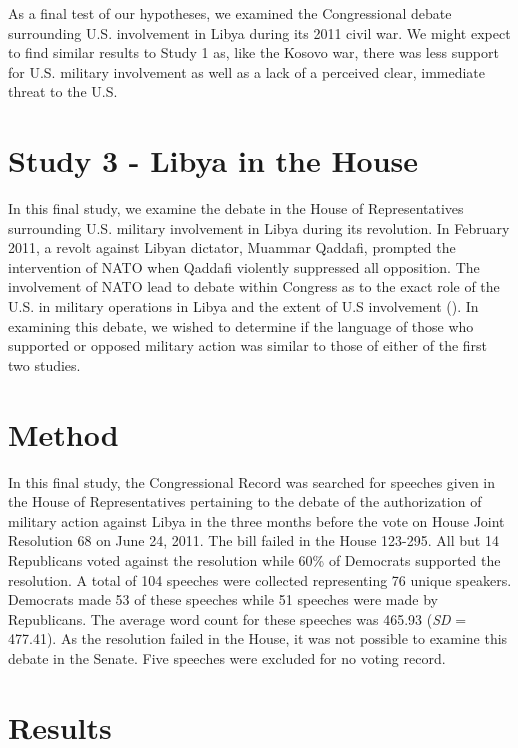 \documentclass[jou,a4paper]{apa6}
\begin{document}
As a final test of our hypotheses, we examined the Congressional debate surrounding U.S. involvement in Libya during its 2011 civil war. We might expect to find similar results to Study 1 as, like the Kosovo war, there was less support for U.S. military involvement as well as a lack of a perceived clear, immediate threat to the U.S.

\section{Study 3 - Libya in the House}

In this final study, we examine the debate in the House of Representatives surrounding U.S. military involvement in Libya during its revolution. In February 2011, a revolt against Libyan dictator, Muammar Qaddafi, prompted the intervention of NATO when Qaddafi violently suppressed all opposition. The involvement of NATO lead to debate within Congress as to the exact role of the U.S. in military operations in Libya and the extent of U.S involvement (\cite{Blanchard2011}). In examining this debate, we wished to determine if the language of those who supported or opposed military action was similar to those of either of the first two studies.

\section{Method}

In this final study, the Congressional Record was searched for speeches given in the House of Representatives pertaining to the debate of the authorization of military action against Libya in the three months before the vote on House Joint Resolution 68 on June 24, 2011. The bill failed in the House 123-295. All but 14 Republicans voted against the resolution while 60\% of Democrats supported the resolution. A total of 104 speeches were collected representing 76 unique speakers. Democrats made 53 of these speeches while 51 speeches were made by Republicans. The average word count for these speeches was 465.93 (\emph{SD} = 477.41). As the resolution failed in the House, it was not possible to examine this debate in the Senate. Five speeches were excluded for no voting record.

\section{Results}
\end{document}
